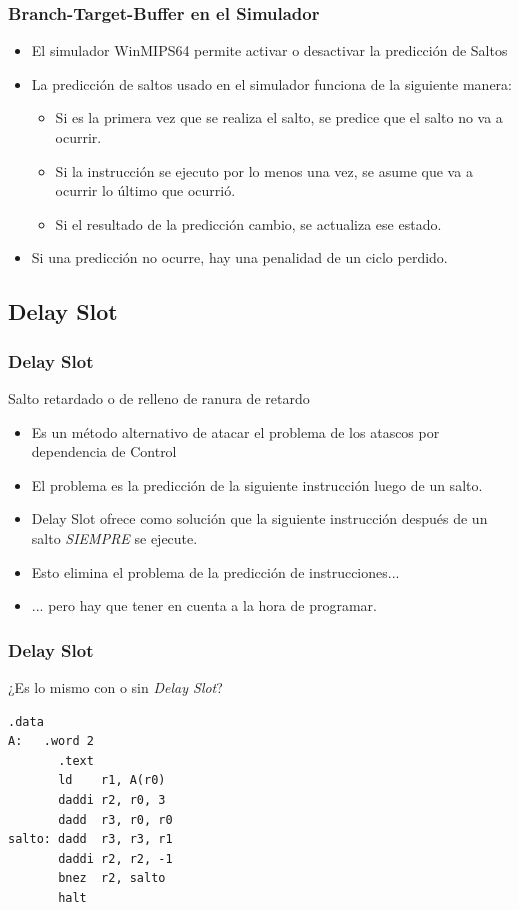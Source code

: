 \documentclass{beamer}
\begin{document}
\begin{frame}
\frametitle{Branch-Target-Buffer en el Simulador}
\begin{itemize}
\item El simulador WinMIPS64 permite activar o desactivar la predicción de Saltos
\item La predicción de saltos usado en el simulador funciona de la siguiente manera:
\begin{itemize}
\item Si es la primera vez que se realiza el salto, se predice que el salto no va a ocurrir.
\item Si la instrucción se ejecuto por lo menos una vez, se asume que va a ocurrir lo último que ocurrió.
\item Si el resultado de la predicción cambio, se actualiza ese estado.
\end{itemize}
\item Si una predicción no ocurre, hay una penalidad de un ciclo perdido.\end{itemize}
\end{frame}


\subsection{Delay Slot}
\begin{frame}
\frametitle{Delay Slot}
Salto retardado o de relleno de ranura de retardo
\begin{itemize}
\item Es un método alternativo de atacar el problema de los atascos por dependencia de Control
\item El problema es la predicción de la siguiente instrucción luego de un salto.
\item Delay Slot ofrece como solución que la siguiente instrucción después de un salto \emph{SIEMPRE} se ejecute.
\item Esto elimina el problema de la predicción de instrucciones...
\item ... pero hay que tener en cuenta a la hora de programar.

\end{itemize}
\end{frame}

\begin{frame}[fragile]
\frametitle{Delay Slot}
¿Es lo mismo con o sin \emph{Delay Slot}?
\begin{block}{}
\begin{lstlisting}[language=WinMIPS64,basicstyle=\ttfamily,keywordstyle=\color{blue}]
       .data
A:   .word 2
       .text
       ld    r1, A(r0)
       daddi r2, r0, 3
       dadd  r3, r0, r0
salto: dadd  r3, r3, r1
       daddi r2, r2, -1
       bnez  r2, salto
       halt
\end{lstlisting}
\end{block}
\end{frame}
\end{document}
